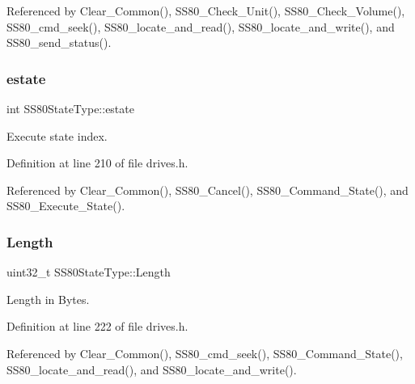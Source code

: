 Referenced by Clear\+\_\+\+Common(), S\+S80\+\_\+\+Check\+\_\+\+Unit(), S\+S80\+\_\+\+Check\+\_\+\+Volume(), S\+S80\+\_\+cmd\+\_\+seek(), S\+S80\+\_\+locate\+\_\+and\+\_\+read(), S\+S80\+\_\+locate\+\_\+and\+\_\+write(), and S\+S80\+\_\+send\+\_\+status().

\mbox{\label{structSS80StateType_ae4a94143cb4201687be4e33684be057e}} 
\subsubsection{\texorpdfstring{estate}{estate}}
{\footnotesize\ttfamily int S\+S80\+State\+Type\+::estate}



Execute state index. 



Definition at line 210 of file drives.\+h.



Referenced by Clear\+\_\+\+Common(), S\+S80\+\_\+\+Cancel(), S\+S80\+\_\+\+Command\+\_\+\+State(), and S\+S80\+\_\+\+Execute\+\_\+\+State().

\mbox{\label{structSS80StateType_a507159f0a0a4f3127488081fd618e8f6}} 
\subsubsection{\texorpdfstring{Length}{Length}}
{\footnotesize\ttfamily uint32\+\_\+t S\+S80\+State\+Type\+::\+Length}



Length in Bytes. 



Definition at line 222 of file drives.\+h.



Referenced by Clear\+\_\+\+Common(), S\+S80\+\_\+cmd\+\_\+seek(), S\+S80\+\_\+\+Command\+\_\+\+State(), S\+S80\+\_\+locate\+\_\+and\+\_\+read(), and S\+S80\+\_\+locate\+\_\+and\+\_\+write().

\mbox{\label{structSS80StateType_ad4911c7b89ec1ff2c0aa01881b1e3d3a}} 
